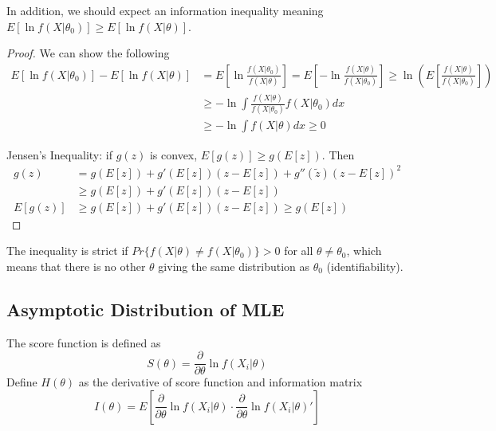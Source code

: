 \documentclass[11pt, a4paper, oneside]{article}
\theoremstyle{definition}
\theoremstyle{proposition}
\theoremstyle{corollary}
\theoremstyle{lemma}
\theoremstyle{theorem}
\begin{document}
In addition, we should expect an information inequality meaning $E[\ln{f(X|\theta_0)}] \geq E[\ln{f(X|\theta)}]$. 

\begin{proof}
We can show the following
\begin{align*}
E[\ln{f(X|\theta_0)}] - E[\ln{f(X|\theta)}] &= E[\ln{\frac{f(X|\theta_0)}{f(X|\theta)}}] =E[-\ln{\frac{f(X|\theta)}{f(X|\theta_0)}}] \geq \ln{(E[\frac{f(X|\theta)}{f(X|\theta_0)}])}\\
&\geq -\ln{\int \frac{f(X|\theta)}{f(X|\theta_0)} f(X|\theta_0)dx}\\
&\geq -\ln{\int f(X|\theta)dx} \geq 0
\end{align*}

Jensen's Inequality: if $g(z)$ is convex, $E[g(z)]\geq g(E[z])$. Then
\begin{align*}
g(z) &= g(E[z]) + g'(E[z])(z - E[z]) + g''(\tilde{z})(z -E[z])^2 \\
&\geq g(E[z]) + g'(E[z])(z - E[z]) \\
E[g(z)] &\geq g(E[z]) + g'(E[z])(z-E[z]) \geq g(E[z])
\end{align*} 
\end{proof}

The inequality is strict if $Pr\{f(X|\theta) \neq f(X|\theta_0)\} > 0$ for all $\theta \neq \theta_0$, which means that there is no other $\theta$ giving the same distribution as $\theta_0$ (identifiability). 

\subsection{Asymptotic Distribution of MLE}
The score function is defined as
$$S(\theta) = \frac{\partial}{\partial \theta} \ln{f(X_i|\theta)}$$
Define $H(\theta)$ as the derivative of score function and information matrix $$I(\theta) = E\left[\frac{\partial}{\partial \theta} \ln{f(X_i|\theta)}\cdot \frac{\partial}{\partial \theta} \ln{f(X_i|\theta)}'\right]$$
\end{document}

